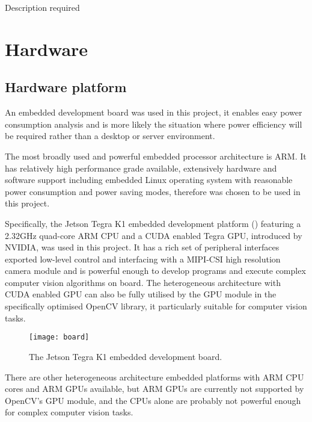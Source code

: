 {\color{red}Description required}

\section{Hardware}


\subsection{Hardware platform}


An embedded development board was used in this project, it enables easy power consumption analysis and  is more likely the situation where power efficiency will be required rather than a desktop or server environment.

The most broadly used and powerful embedded processor architecture is ARM. It has relatively high performance grade available, extensively hardware and software support including embedded Linux operating system with reasonable power consumption and  power saving modes, therefore was chosen to be used in this project.

Specifically, the Jetson Tegra K1 embedded development platform \cite{NVIDIA:tk1} () featuring a 2.32GHz quad-core ARM CPU and a CUDA enabled Tegra GPU, introduced by NVIDIA, was used in this project. It has a rich set of peripheral interfaces exported  low-level control and interfacing with a MIPI-CSI high resolution camera module and is powerful enough to develop programs and execute complex computer vision algorithms on board. The heterogeneous architecture with CUDA enabled GPU can also be fully utilised by the GPU module in the specifically optimised OpenCV library,  it particularly suitable for computer vision tasks.

\begin{figure}[htb]
  \centering
  \texttt{[image: board]}
  \caption{The Jetson Tegra K1 embedded development board.}
  \label{des:board}
\end{figure}

There are other heterogeneous architecture embedded platforms with ARM CPU cores and ARM GPUs available, but ARM GPUs are currently not supported by OpenCV's GPU module, and the CPUs alone are probably not powerful enough for complex computer vision tasks.

